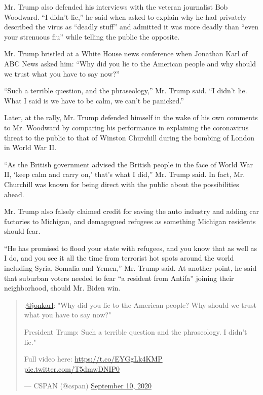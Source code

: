 Mr. Trump also defended his interviews with the veteran journalist Bob
Woodward. ``I didn't lie,'' he said when asked to explain why he had
privately described the virus as ``deadly stuff'' and admitted it was
more deadly than ``even your strenuous flu'' while telling the public
the opposite.

Mr. Trump bristled at a White House news conference when Jonathan Karl
of ABC News asked him: ``Why did you lie to the American people and why
should we trust what you have to say now?''

``Such a terrible question, and the phraseology,'' Mr. Trump said. ``I
didn't lie. What I said is we have to be calm, we can't be panicked.''

Later, at the rally, Mr. Trump defended himself in the wake of his own
comments to Mr. Woodward by comparing his performance in explaining the
coronavirus threat to the public to that of Winston Churchill during the
bombing of London in World War II.

``As the British government advised the British people in the face of
World War II, `keep calm and carry on,' that's what I did,'' Mr. Trump
said. In fact, Mr. Churchill was known for being direct with the public
about the possibilities ahead.

Mr. Trump also falsely claimed credit for saving the auto industry and
adding car factories to Michigan, and demagogued refugees as something
Michigan residents should fear.

``He has promised to flood your state with refugees, and you know that
as well as I do, and you see it all the time from terrorist hot spots
around the world including Syria, Somalia and Yemen,'' Mr. Trump said.
At another point, he said that suburban voters needed to fear ``a
resident from Antifa'' joining their neighborhood, should Mr. Biden win.

\begin{quote}
.\href{https://twitter.com/jonkarl?ref_src=twsrc\%5Etfw}{@jonkarl}: "Why
did you lie to the American people? Why should we trust what you have to
say now?"

President Trump: Such a terrible question and the phraseology. I didn't
lie."

Full video here: \url{https://t.co/EYGgLk4KMP}
\href{https://t.co/T5dmwDNIP0}{pic.twitter.com/T5dmwDNIP0}

--- CSPAN (@cspan)
\href{https://twitter.com/cspan/status/1304148164262408192?ref_src=twsrc\%5Etfw}{September
10, 2020}
\end{quote}

